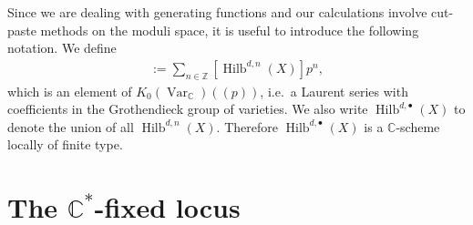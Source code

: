 \documentclass{amsart}
\theoremstyle{definition}
\newcommand{\CC} {\mathbb{C}}          %
\newcommand{\ZZ} {\mathbb{Z}}		%
\newcommand{\Hilb}{\operatorname{Hilb}}
\newcommand{\Var}{\operatorname{Var}}
\begin{document}
Since we are dealing with generating functions and our calculations involve cut-paste methods on the moduli space, it is useful to introduce the following notation. We define
\begin{align*}
[\Hilb^{d,\bullet}(X)] := \sum_{n \in \ZZ} [\Hilb^{d,n}(X)] p^n,
\end{align*}
which is an element of $K_0(\Var_{\CC})(\!(p)\!)$, i.e.~a Laurent series with coefficients in the Grothendieck group of varieties. We also write $\Hilb^{d,\bullet}(X)$ to denote the union of all $\Hilb^{d,n}(X)$. Therefore $\Hilb^{d,\bullet}(X)$ is a $\CC$-scheme locally of finite type.


\section{The $\CC^*$-fixed locus} \label{fixedlocus}
\end{document}
